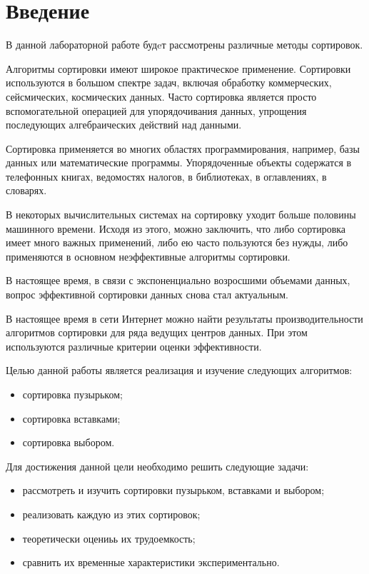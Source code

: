 \chapter*{Введение}

В данной лабораторной работе будeт рассмотрены различные методы сортировок.

Алгоритмы сортировки имеют широкое практическое применение. Сортировки используются в большом спектре задач, включая обработку коммерческих, сейсмических, космических данных. Часто сортировка является просто вспомогательной операцией для упорядочивания данных, упрощения последующих алгебраических действий над данными.

Сортировка применяется во многих областях программирования, например, базы данных или математические программы. Упорядоченные объекты содержатся в телефонных книгах, ведомостях налогов, в библиотеках, в оглавлениях, в словарях.

В некоторых вычислительных системах на сортировку уходит больше половины машинного времени. Исходя из этого, можно заключить, что либо сортировка имеет много важных применений, либо ею часто пользуются без нужды, либо применяются в основном неэффективные алгоритмы сортировки.

В настоящее время, в связи с экспоненциально возросшими объемами данных, вопрос эффективной сортировки данных снова стал актуальным.

В настоящее время в сети Интернет можно найти результаты производительности алгоритмов сортировки для ряда ведущих центров данных. При этом используются различные критерии оценки эффективности.

Целью данной работы является реализация и изучение следующих алгоритмов:
\begin{itemize}
	\item сортировка пузырьком;
	\item сортировка вставками;
	\item сортировка выбором.
\end{itemize}

Для достижения данной цели необходимо решить следующие задачи:

\begin{itemize}
	\item рассмотреть и изучить сортировки пузырьком, вставками и выбором;
	\item реализовать каждую из этих сортировок;
	\item теоретически оцениьь их трудоемкость;
	\item сравнить их временные характеристики экспериментально.
\end{itemize}
